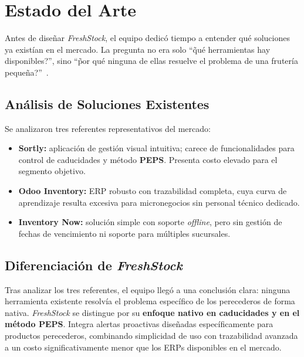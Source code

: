 \documentclass[journal]{IEEEtran}
\newcommand{\app}{\textit{FreshStock}}
\newcommand{\peps}{\textbf{PEPS}}
\begin{document}
	
	
	\section{Estado del Arte}
	\label{sec:arte}
	
	Antes de dise\~{n}ar \app{}, el equipo dedic\'{o} tiempo a
	entender qu\'{e} soluciones ya exist\'{i}an en el mercado. La
	pregunta no era solo ``\~{q}u\'{e} herramientas hay disponibles?'',
	sino ``\~{p}or qu\'{e} ninguna de ellas resuelve el problema de
	una fruter\'{i}a peque\~{n}a?''~\cite{Silver:2016}.
	
	\subsection{An\'{a}lisis de Soluciones Existentes}
	\label{subsec:referentes}
	
	Se analizaron tres referentes representativos del mercado:
	
	\begin{itemize}[leftmargin=*, label=\textbullet, itemsep=3pt]
		\item \textbf{Sortly:} aplicaci\'{o}n de gesti\'{o}n visual intuitiva;
		carece de funcionalidades para control de caducidades y
		m\'{e}todo \peps{}. Presenta costo elevado para el segmento
		objetivo.
		
		\item \textbf{Odoo Inventory:} ERP robusto con trazabilidad
		completa, cuya curva de aprendizaje resulta excesiva
		para micronegocios sin personal t\'{e}cnico dedicado.
		
		\item \textbf{Inventory Now:} soluci\'{o}n simple con soporte
		\textit{offline}, pero sin gesti\'{o}n de fechas de
		vencimiento ni soporte para m\'{u}ltiples sucursales.
	\end{itemize}
	
	\subsection{Diferenciaci\'{o}n de \app{}}
	\label{subsec:diferenciacion}
	
	Tras analizar los tres referentes, el equipo lleg\'{o} a una
	conclusi\'{o}n clara: ninguna herramienta existente resolv\'{i}a
	el problema espec\'{i}fico de los perecederos de forma nativa.
	\app{} se distingue por su \textbf{enfoque nativo en caducidades y
		en el m\'{e}todo \peps{}}. Integra alertas proactivas dise\~{n}adas
	espec\'{i}ficamente para productos perecederos, combinando simplicidad
	de uso con trazabilidad avanzada a un costo significativamente
	menor que los ERPs disponibles en el mercado.
	
\end{document}
